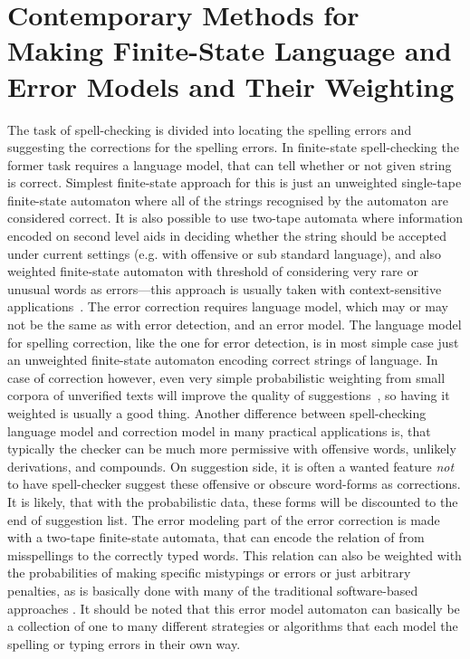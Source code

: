 \documentclass[a4paper,12pt]{article}
\begin{document}
\section{Contemporary Methods for Making Finite-State Language and Error Models
and Their Weighting}
\label{sec:methods}

The task of spell-checking is divided into locating the spelling errors and
suggesting the corrections for the spelling errors. In finite-state
spell-checking the former task requires a language model, that can tell whether
or not given string is correct. Simplest finite-state approach for this is just
an unweighted single-tape finite-state automaton where all of the strings
recognised by the automaton are considered correct. It is also possible to use
two-tape automata where information encoded on second level aids in deciding
whether the string should be accepted under current settings (e.g. with
offensive or sub standard language), and also weighted finite-state automaton
with threshold of considering very rare or unusual words as errors---this
approach is usually taken with context-sensitive
applications~\cite[]{otero/2007}. The error correction requires language model,
which may or may not be the same as with error detection, and an error model.
The language model for spelling correction, like the one for error detection,
is in most simple case just an unweighted finite-state automaton encoding
correct strings of language. In case of correction however, even very simple
probabilistic weighting from small corpora of unverified texts will improve the
quality of suggestions~\cite[]{pirinen/2010/lrec}, so having it weighted is
usually a good thing. Another difference between spell-checking language model
and correction model in many practical applications is, that typically the
checker can be much more permissive with offensive words, unlikely derivations,
and compounds. On suggestion side, it is often a wanted feature \emph{not} to
have spell-checker suggest these offensive or obscure word-forms as
corrections. It is likely, that with the probabilistic data, these forms will
be discounted to the end of suggestion list.  The error modeling part of the
error correction is made with a two-tape finite-state automata, that can encode
the relation of from misspellings to the correctly typed words. This relation
can also be weighted with the probabilities of making specific mistypings or
errors or just arbitrary penalties, as is basically done with many of the
traditional software-based approaches \cite[such as][]{hunspell/manual}. It
should be noted that this error model automaton can basically be a collection
of one to many different strategies or algorithms that each model the spelling
or typing errors in their own way.
\end{document}
